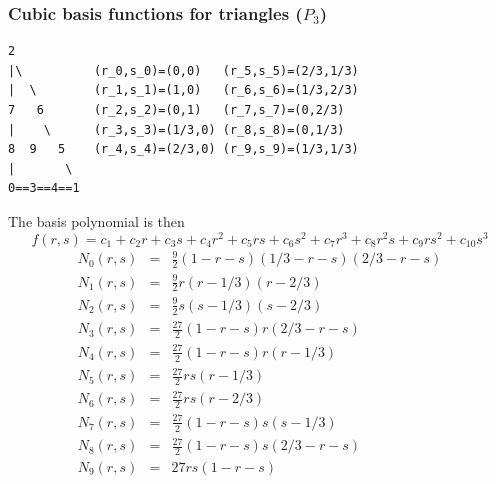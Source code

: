 \subsubsection{Cubic basis functions for triangles ($P_3$)}

\begin{verbatim}
2
|\          (r_0,s_0)=(0,0)   (r_5,s_5)=(2/3,1/3)
|  \        (r_1,s_1)=(1,0)   (r_6,s_6)=(1/3,2/3)
7   6       (r_2,s_2)=(0,1)   (r_7,s_7)=(0,2/3)
|    \      (r_3,s_3)=(1/3,0) (r_8,s_8)=(0,1/3)
8  9   5    (r_4,s_4)=(2/3,0) (r_9,s_9)=(1/3,1/3)
|       \ 
0==3==4==1
\end{verbatim}
The basis polynomial is then
\[
f(r,s) = c_1 + c_2r + c_3s + c_4 r^2 + c_5 rs + c_6 s^2 + c_7 r^3 +c_8 r^2s + c_9 rs^2 + c_{10}s^3
\]
\begin{eqnarray}
N_0(r,s) &=& \frac{9}{2}(1-r-s)(1/3-r-s)(2/3-r-s) \\
N_1(r,s) &=& \frac{9}{2}r(r-1/3)(r-2/3) \\
N_2(r,s) &=& \frac{9}{2}s(s-1/3)(s-2/3) \\
N_3(r,s) &=& \frac{27}{2}(1-r-s)r(2/3-r-s) \\
N_4(r,s) &=& \frac{27}{2}(1-r-s)r(r-1/3) \\
N_5(r,s) &=& \frac{27}{2}rs(r-1/3) \\
N_6(r,s) &=& \frac{27}{2}rs(r-2/3) \\
N_7(r,s) &=& \frac{27}{2}(1-r-s)s(s-1/3) \\
N_8(r,s) &=& \frac{27}{2}(1-r-s)s(2/3-r-s) \\
N_9(r,s) &=& 27 rs(1-r-s)
\end{eqnarray}




















